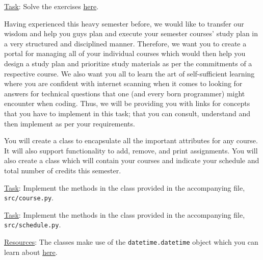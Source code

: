 \documentclass[a4paper]{exam}
\begin{document}
\begin{questions}
\noindent\underline{Task}: Solve the exercises \href{https://pynative.com/python-object-oriented-programming-oop-exercise/}{here}.



Having experienced this heavy semester before, we would like to transfer our wisdom and help you guys plan and execute your semester courses' study plan in a very structured and disciplined manner. Therefore, we want you to create a portal for managing all of your individual courses which would then help you design a study plan and prioritize study materials as per the commitments of a respective course. We also want you all to learn the art of self-sufficient learning where you are confident with internet scanning when it comes to looking for answers for technical questions that one (and every born programmer) might encounter when coding. Thus, we will be providing you with links for concepts that you have to implement in this task; that you can consult, understand and then implement as per your requirements.

You will create a  class to encapsulate all the important attributes for any course. It will also support functionality to add, remove, and print assignments. You will also create a  class which will contain your courses and indicate your schedule and total number of credits this semester.

\noindent\underline{Task}: Implement the methods in the  class provided in the accompanying file, \texttt{src/course.py}.

\noindent\underline{Task}: Implement the methods in the  class provided in the accompanying file, \texttt{src/schedule.py}.

\noindent\underline{Resources}: The classes make use of the \texttt{datetime.datetime} object which you can learn about \href{https://betterprogramming.pub/demystifying-python-datetime-module-with-examples-352e6cc72efc}{here}.


\end{questions}
\end{document}
